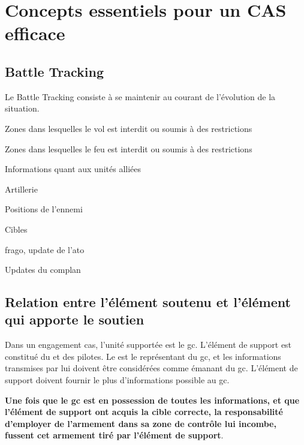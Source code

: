 \section{Concepts essentiels pour un CAS efficace}


\subsection{Battle Tracking}

Le Battle Tracking consiste à se maintenir au courant de l'évolution de la situation.

\begin{e1}
	\item Zones dans lesquelles le vol est interdit ou soumis à des restrictions
	\item Zones dans lesquelles le feu est interdit ou soumis à des restrictions
	\item Informations quant aux unités alliées
	\item Artillerie
	\item Positions de l'ennemi
	\item Cibles
	\item \gls{frago}, update de l'\gls{ato}
	\item Updates du \gls{complan}
\end{e1}

\subsection{Relation entre l'élément soutenu et l'élément qui apporte le soutien}


Dans un engagement \gls{cas}, l'unité supportée est le \gls{gc}. L'élément de support est constitué du \ja{} et des pilotes. Le \ja{} est le représentant du \gls{gc}, et les informations transmises par lui doivent être considérées comme émanant du \gls{gc}. L'élément de support doivent fournir le plus d'informations possible au \gls{gc}.

\textbf{Une fois que le \gls{gc} est en possession de toutes les informations, et que l'élément de support ont acquis la cible correcte, la responsabilité d'employer de l'armement dans sa zone de contrôle lui incombe, fussent cet armement tiré par l'élément de support}.

